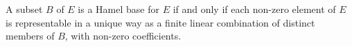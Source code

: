 A subset $B$ of $E$ is a Hamel base for $E$ if and only if each non-zero element of $E$ is representable in a unique way as a finite linear combination of distinct members of $B$, with non-zero coefficients.
